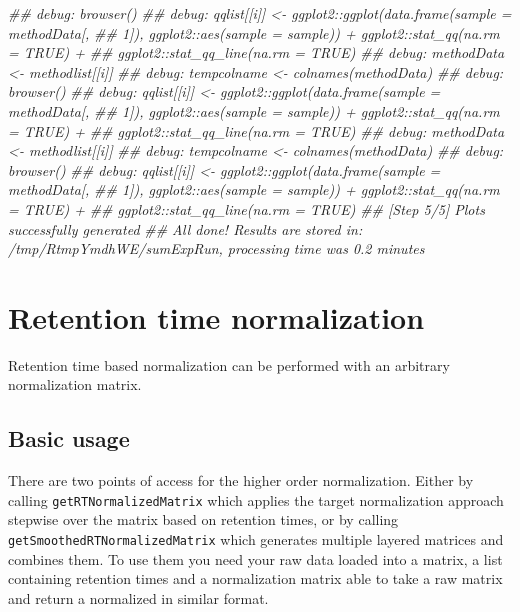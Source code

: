 \documentclass[]{article}
\newcommand{\hlcom}[1]{\textcolor[rgb]{0.502,0.502,0.502}{\textit{#1}}}%
\newenvironment{Shaded}{\begin{myshaded}}{\end{myshaded}}
\newcommand{\DocumentationTok}[1]{\hlcom{#1}}
\begin{document}
\begin{Shaded}
\begin{Highlighting}[]
\DocumentationTok{\#\# debug: browser()}
\DocumentationTok{\#\# debug: qqlist[[i]] \textless{}{-} ggplot2::ggplot(data.frame(sample = methodData[, }
\DocumentationTok{\#\#     1]), ggplot2::aes(sample = sample)) + ggplot2::stat\_qq(na.rm = TRUE) + }
\DocumentationTok{\#\#     ggplot2::stat\_qq\_line(na.rm = TRUE)}
\DocumentationTok{\#\# debug: methodData \textless{}{-} methodlist[[i]]}
\DocumentationTok{\#\# debug: tempcolname \textless{}{-} colnames(methodData)}
\DocumentationTok{\#\# debug: browser()}
\DocumentationTok{\#\# debug: qqlist[[i]] \textless{}{-} ggplot2::ggplot(data.frame(sample = methodData[, }
\DocumentationTok{\#\#     1]), ggplot2::aes(sample = sample)) + ggplot2::stat\_qq(na.rm = TRUE) + }
\DocumentationTok{\#\#     ggplot2::stat\_qq\_line(na.rm = TRUE)}
\DocumentationTok{\#\# debug: methodData \textless{}{-} methodlist[[i]]}
\DocumentationTok{\#\# debug: tempcolname \textless{}{-} colnames(methodData)}
\DocumentationTok{\#\# debug: browser()}
\DocumentationTok{\#\# debug: qqlist[[i]] \textless{}{-} ggplot2::ggplot(data.frame(sample = methodData[, }
\DocumentationTok{\#\#     1]), ggplot2::aes(sample = sample)) + ggplot2::stat\_qq(na.rm = TRUE) + }
\DocumentationTok{\#\#     ggplot2::stat\_qq\_line(na.rm = TRUE)}
\DocumentationTok{\#\# [Step 5/5] Plots successfully generated}
\DocumentationTok{\#\# All done! Results are stored in: /tmp/RtmpYmdhWE/sumExpRun, processing time was 0.2 minutes}
\end{Highlighting}
\end{Shaded}

\hypertarget{retention-time-normalization}{%
\section{Retention time normalization}\label{retention-time-normalization}}

Retention time based normalization can be performed with an arbitrary normalization matrix.

\hypertarget{basic-usage}{%
\subsection{Basic usage}\label{basic-usage}}

There are two points of access for the higher order normalization. Either by calling \texttt{getRTNormalizedMatrix} which applies the target normalization approach stepwise over the matrix based on retention times, or by calling \texttt{getSmoothedRTNormalizedMatrix} which generates multiple layered matrices and combines them. To use them you need your raw data loaded into a matrix, a list containing retention times and a normalization matrix able to take a raw matrix and return a normalized in similar format.
\end{document}
